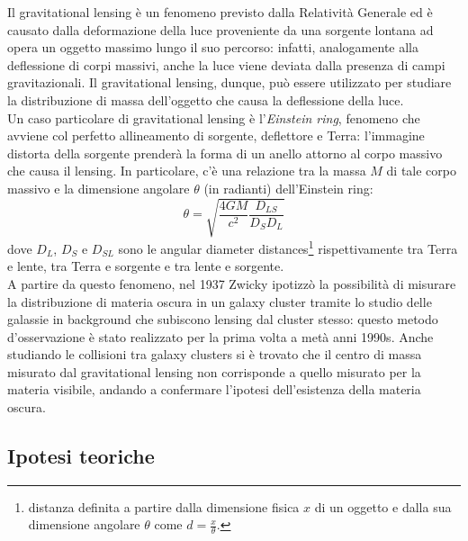 Il gravitational lensing è un fenomeno previsto dalla Relatività Generale ed è causato dalla deformazione della luce proveniente da una sorgente lontana ad opera un oggetto massimo lungo il suo percorso: infatti, analogamente alla deflessione di corpi massivi, anche la luce viene deviata dalla presenza di campi gravitazionali. Il gravitational lensing, dunque, può essere utilizzato per studiare la distribuzione di massa dell'oggetto che causa la deflessione della luce.\\
Un caso particolare di gravitational lensing è l'\textit{Einstein ring}, fenomeno che avviene col perfetto allineamento di sorgente, deflettore e Terra: l'immagine distorta della sorgente prenderà la forma di un anello attorno al corpo massivo che causa il lensing. In particolare, c'è una relazione tra la massa $ M $ di tale corpo massivo e la dimensione angolare $ \theta $ (in radianti) dell'Einstein ring:
\begin{equation}
	\theta = \sqrt{\frac{4GM}{c^2} \frac{D_{LS}}{D_S D_L}}
	\label{eq:11.3}
\end{equation}
dove $ D_L $, $ D_S $ e $ D_{SL} $ sono le angular diameter distances\footnote{distanza definita a partire dalla dimensione fisica $ x $ di un oggetto e dalla sua dimensione angolare $ \theta $ come $ d = \frac{x}{\theta} $.} rispettivamente tra Terra e lente, tra Terra e sorgente e tra lente e sorgente.\\
A partire da questo fenomeno, nel 1937 Zwicky ipotizzò la possibilità di misurare la distribuzione di materia oscura in un galaxy cluster tramite lo studio delle galassie in background che subiscono lensing dal cluster stesso: questo metodo d'osservazione è stato realizzato per la prima volta a metà anni 1990s. Anche studiando le collisioni tra galaxy clusters si è trovato che il centro di massa misurato dal gravitational lensing non corrisponde a quello misurato per la materia visibile, andando a confermare l'ipotesi dell'esistenza della materia oscura.

\subsection{Ipotesi teoriche}

